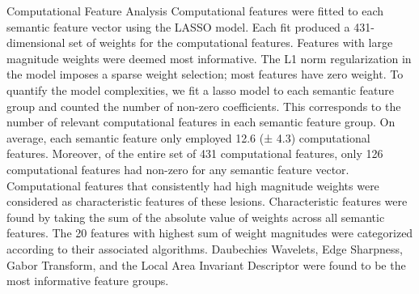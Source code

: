 Computational Feature Analysis
Computational features were fitted to each semantic feature vector using the LASSO model. Each fit produced a 431-dimensional set of weights for the computational features. Features with large magnitude weights were deemed most informative.  The L1 norm regularization in the model imposes a sparse weight selection; most features have zero weight. To quantify the model complexities, we fit a lasso model to each semantic feature group and counted the number of non-zero coefficients. This corresponds to the number of relevant computational features in each semantic feature group. On average, each semantic feature only employed 12.6 (± 4.3) computational features. Moreover, of the entire set of 431 computational features, only 126 computational features had non-zero for any semantic feature vector. 
Computational features that consistently had high magnitude weights were considered as characteristic features of these lesions. Characteristic features were found by taking the sum of the absolute value of weights across all semantic features. The 20 features with highest sum of weight magnitudes were categorized according to their associated algorithms. Daubechies Wavelets, Edge Sharpness, Gabor Transform, and the Local Area Invariant Descriptor were found to be the most informative feature groups.

